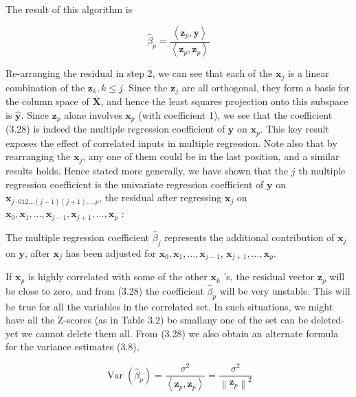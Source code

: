 \documentclass[10pt]{article}
\begin{document}
The result of this algorithm is


\begin{equation*}
\hat{\beta}_{p}=\frac{\left\langle\mathbf{z}_{p}, \mathbf{y}\right\rangle}{\left\langle\mathbf{z}_{p}, \mathbf{z}_{p}\right\rangle} \tag{3.28}
\end{equation*}


Re-arranging the residual in step 2, we can see that each of the $\mathbf{x}_{j}$ is a linear combination of the $\mathbf{z}_{k}, k \leq j$. Since the $\mathbf{z}_{j}$ are all orthogonal, they form a basis for the column space of $\mathbf{X}$, and hence the least squares projection onto this subspace is $\hat{\mathbf{y}}$. Since $\mathbf{z}_{p}$ alone involves $\mathbf{x}_{p}$ (with coefficient 1), we see that the coefficient (3.28) is indeed the multiple regression coefficient of $\mathbf{y}$ on $\mathbf{x}_{p}$. This key result exposes the effect of correlated inputs in multiple regression. Note also that by rearranging the $\mathbf{x}_{j}$, any one of them could be in the last position, and a similar results holds. Hence stated more generally, we have shown that the $j$ th multiple regression coefficient is the univariate regression coefficient of $\mathbf{y}$ on $\mathbf{x}_{j \cdot 012 \ldots(j-1)(j+1) \ldots, p}$, the residual after regressing $\mathbf{x}_{j}$ on $\mathbf{x}_{0}, \mathbf{x}_{1}, \ldots, \mathbf{x}_{j-1}, \mathbf{x}_{j+1}, \ldots, \mathbf{x}_{p}$ :

The multiple regression coefficient $\hat{\beta}_{j}$ represents the additional contribution of $\mathbf{x}_{j}$ on $\mathbf{y}$, after $\mathbf{x}_{j}$ has been adjusted for $\mathbf{x}_{0}, \mathbf{x}_{1}, \ldots, \mathbf{x}_{j-1}$, $\mathbf{x}_{j+1}, \ldots, \mathbf{x}_{p}$.

If $\mathbf{x}_{p}$ is highly correlated with some of the other $\mathbf{x}_{k}$ 's, the residual vector $\mathbf{z}_{p}$ will be close to zero, and from (3.28) the coefficient $\hat{\beta}_{p}$ will be very unstable. This will be true for all the variables in the correlated set. In such situations, we might have all the Z-scores (as in Table 3.2) be smallany one of the set can be deleted-yet we cannot delete them all. From (3.28) we also obtain an alternate formula for the variance estimates (3.8),


\begin{equation*}
\operatorname{Var}\left(\hat{\beta}_{p}\right)=\frac{\sigma^{2}}{\left\langle\mathbf{z}_{p}, \mathbf{z}_{p}\right\rangle}=\frac{\sigma^{2}}{\left\|\mathbf{z}_{p}\right\|^{2}} \tag{3.29}
\end{equation*}
\end{document}
